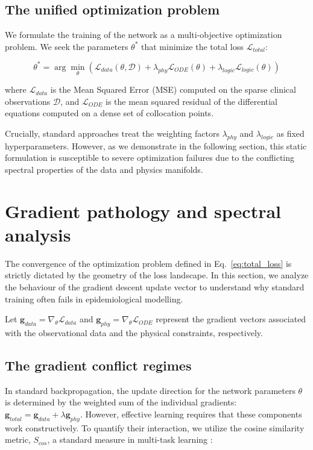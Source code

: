 \documentclass[11pt]{article}
\begin{document}
\subsection{The unified optimization problem}
We formulate the training of the network as a multi-objective optimization problem. We seek the parameters $\theta^*$ that minimize the total loss $\mathcal{L}_{total}$:

\begin{equation}\label{eq:total_loss}
    \theta^* = \arg \min_{\theta} \left( \mathcal{L}_{data}(\theta, \mathcal{D}) + \lambda_{phy} \mathcal{L}_{ODE}(\theta) + \lambda_{logic} \mathcal{L}_{logic}(\theta) \right)
\end{equation}

where $\mathcal{L}_{data}$ is the Mean Squared Error (MSE) computed on the sparse clinical observations $\mathcal{D}$, and $\mathcal{L}_{ODE}$ is the mean squared residual of the differential equations computed on a dense set of collocation points. 

Crucially, standard approaches treat the weighting factors $\lambda_{phy}$ and $\lambda_{logic}$ as fixed hyperparameters. However, as we demonstrate in the following section, this static formulation is susceptible to severe optimization failures due to the conflicting spectral properties of the data and physics manifolds.

\section{Gradient pathology and spectral analysis}
\label{sec:gradient_pathology}

The convergence of the optimization problem defined in Eq.~\eqref{eq:total_loss} is strictly dictated by the geometry of the loss landscape. In this section, we analyze the behaviour of the gradient descent update vector to understand why standard training often fails in epidemiological modelling.

Let $\mathbf{g}_{data} = \nabla_\theta \mathcal{L}_{data}$ and $\mathbf{g}_{phy} = \nabla_\theta \mathcal{L}_{ODE}$ represent the gradient vectors associated with the observational data and the physical constraints, respectively.

\subsection{The gradient conflict regimes}
In standard backpropagation, the update direction for the network parameters $\theta$ is determined by the weighted sum of the individual gradients: $\mathbf{g}_{total} = \mathbf{g}_{data} + \lambda \mathbf{g}_{phy}$. However, effective learning requires that these components work constructively. To quantify their interaction, we utilize the cosine similarity metric, $S_{cos}$, a standard measure in multi-task learning \cite{yu2020gradient}:
\end{document}
